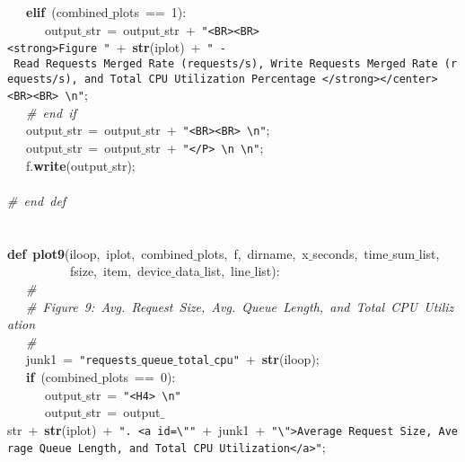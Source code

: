 \mbox{}\ \ \ \textbf{elif}\ (combined$\_$plots\ ==\ 1): \\
\mbox{}\ \ \ \ \ \ output$\_$str\ =\ output$\_$str\ +\ \texttt{"{}\textless{}BR\textgreater{}\textless{}BR\textgreater{}\textless{}strong\textgreater{}Figure\ "{}}\ +\ \textbf{str}(iplot)\ +\ \texttt{"{}\ -\ Read\ Requests\ Merged\ Rate\ (requests/s),\ Write\ Requests\ Merged\ Rate\ (requests/s),\ and\ Total\ CPU\ Utilization\ Percentage\ \textless{}/strong\textgreater{}\textless{}/center\textgreater{}\textless{}BR\textgreater{}\textless{}BR\textgreater{}\ \textbackslash{}n"{}}; \\
\mbox{}\ \ \ \textit{\#\ end\ if} \\
\mbox{}\ \ \ output$\_$str\ =\ output$\_$str\ +\ \texttt{"{}\textless{}BR\textgreater{}\textless{}BR\textgreater{}\ \textbackslash{}n"{}}; \\
\mbox{}\ \ \ output$\_$str\ =\ output$\_$str\ +\ \texttt{"{}\textless{}/P\textgreater{}\ \textbackslash{}n\ \textbackslash{}n"{}}; \\
\mbox{}\ \ \ f.\textbf{write}(output$\_$str); \\
\mbox{}\ \ \  \\
\mbox{}\textit{\#\ end\ def} \\
\mbox{} \\
\mbox{} \\
\mbox{}\textbf{def}\ \textbf{plot9}(iloop,\ iplot,\ combined$\_$plots,\ f,\ dirname,\ x$\_$seconds,\ time$\_$sum$\_$list, \\
\mbox{}\ \ \ \ \ \ \ \ \ \ fsize,\ item,\ device$\_$data$\_$list,\ line$\_$list): \\
\mbox{}\ \ \ \textit{\#} \\
\mbox{}\ \ \ \textit{\#\ Figure\ 9:\ Avg.\ Request\ Size,\ Avg.\ Queue\ Length,\ and\ Total\ CPU\ Utilization} \\
\mbox{}\ \ \ \textit{\#} \\
\mbox{}\ \ \ junk1\ =\ \texttt{"{}requests$\_$queue$\_$total$\_$cpu"{}}\ +\ \textbf{str}(iloop); \\
\mbox{}\ \ \ \textbf{if}\ (combined$\_$plots\ ==\ 0): \\
\mbox{}\ \ \ \ \ \ output$\_$str\ =\ \texttt{"{}\textless{}H4\textgreater{}\ \textbackslash{}n"{}} \\
\mbox{}\ \ \ \ \ \ output$\_$str\ =\ output$\_$str\ +\ \textbf{str}(iplot)\ +\ \texttt{"{}.\ \textless{}a\ id=\textbackslash{}"{}"{}}\ +\ junk1\ +\ \texttt{"{}\textbackslash{}"{}\textgreater{}Average\ Request\ Size,\ Average\ Queue\ Length,\ and\ Total\ CPU\ Utilization\textless{}/a\textgreater{}"{}}; \\
